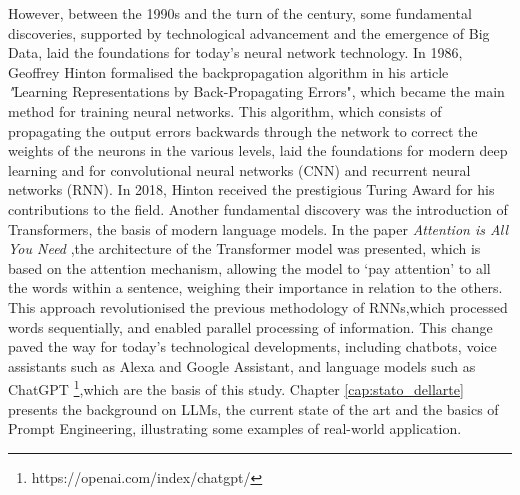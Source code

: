 However, between the 1990s and the turn of the century, some fundamental discoveries, supported by technological advancement and the emergence of Big Data, laid the foundations for today's neural network technology.
In 1986, Geoffrey Hinton formalised the backpropagation algorithm in his article \textit"{Learning Representations by Back-Propagating Errors}"\cite{Rumelhart1986LearningRB},  which became the main method for training neural networks. 
This algorithm, which consists of propagating the output errors backwards through the network to correct the weights of the neurons in the various levels, laid the foundations for modern deep learning and for convolutional neural networks (CNN)\cite{Cnn} and recurrent neural networks (RNN)\cite{Rnn}.
In 2018, Hinton received the prestigious Turing Award for his contributions to the field.
Another fundamental discovery was the introduction of Transformers, the basis of modern language models. 
In the paper \textit{Attention is All You Need} \cite{Attention},the architecture of the Transformer model was presented, which is based on the attention mechanism, allowing the model to ‘pay attention’ to all the words within a sentence, weighing their importance in relation to the others.
This approach revolutionised the previous methodology of RNNs\cite{Rnn},which processed words sequentially, and enabled parallel processing of information.
This change paved the way for today's technological developments, including chatbots, voice assistants such as Alexa and Google Assistant, and language models such as ChatGPT \footnote{https://openai.com/index/chatgpt/},which are the basis of this study. 
Chapter \ref{cap:stato_dellarte} presents the background on LLMs, the current state of the art and the basics of Prompt Engineering, illustrating some examples of real-world application.
